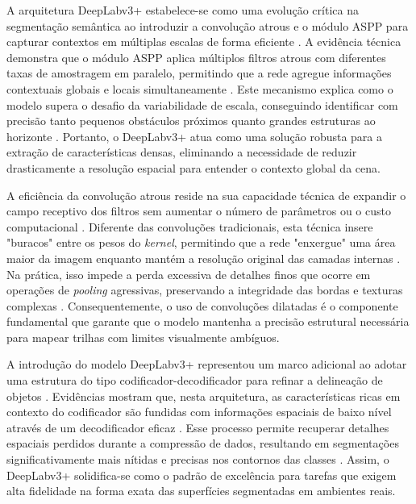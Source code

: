 \documentclass[a4paper,10pt, twocolumn]{article}
\begin{document}
A arquitetura DeepLabv3+ estabelece-se como uma evolução crítica na segmentação semântica ao introduzir 
a convolução atrous e o módulo ASPP para capturar contextos em múltiplas escalas de 
forma eficiente \cite{LATEEF2019321, GARCIAGARCIA201841}. A evidência técnica demonstra que o
módulo ASPP aplica múltiplos filtros atrous com diferentes taxas de amostragem em paralelo, permitindo que a 
rede agregue informações contextuais globais e locais simultaneamente \cite{LATEEF2019321, Sgibnev2020, BEYCIMEN2026113680}. 
Este mecanismo explica como o modelo supera o desafio da variabilidade de escala, conseguindo identificar com precisão tanto 
pequenos obstáculos próximos quanto grandes estruturas ao horizonte \cite{LATEEF2019321, Sgibnev2020}. Portanto, o DeepLabv3+ atua 
como uma solução robusta para a extração de características densas, eliminando a necessidade de reduzir drasticamente a 
resolução espacial para entender o contexto global da cena.

A eficiência da convolução atrous reside na sua capacidade técnica de expandir o campo receptivo dos filtros sem 
aumentar o número de parâmetros ou o custo computacional \cite{LATEEF2019321, GARCIAGARCIA201841, Sgibnev2020}. Diferente das 
convoluções tradicionais, esta técnica insere "buracos" entre os pesos do \textit{kernel}, permitindo que a rede "enxergue" 
uma área maior da imagem enquanto mantém a resolução original das camadas internas \cite{LATEEF2019321, GARCIAGARCIA201841}. Na 
prática, isso impede a perda excessiva de detalhes finos que ocorre em operações de \textit{pooling} agressivas, 
preservando a integridade das bordas e texturas complexas \cite{LATEEF2019321, GARCIAGARCIA201841}. Consequentemente, o uso 
de convoluções dilatadas é o componente fundamental que garante que o modelo mantenha a precisão estrutural necessária para 
mapear trilhas com limites visualmente ambíguos.

A introdução do modelo DeepLabv3+ representou um marco adicional ao adotar uma estrutura do 
tipo codificador-decodificador para refinar a delineação de objetos \cite{LATEEF2019321, Sgibnev2020, BEYCIMEN2026113680}. Evidências 
mostram que, nesta arquitetura, as características ricas em contexto do codificador
são fundidas com informações espaciais de baixo nível através de um decodificador eficaz \cite{LATEEF2019321, Sgibnev2020, s19112577}. 
Esse processo permite recuperar detalhes espaciais perdidos durante a compressão de dados, resultando em 
segmentações significativamente mais nítidas e precisas nos contornos das classes \cite{LATEEF2019321, Sgibnev2020}. Assim, o 
DeepLabv3+ solidifica-se como o padrão de excelência para tarefas que exigem alta fidelidade na forma exata das 
superfícies segmentadas em ambientes reais.
\end{document}
